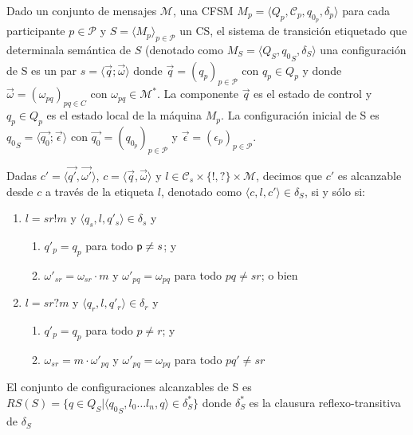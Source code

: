 \begin{definition}
\label{def:estadosyconf} Dado un conjunto de mensajes $\mathcal{M}$, una CFSM $\textit{M}_p = \langle Q_p, \mathcal{C}_p, q_{0_p}, \delta_p \rangle$ para cada participante $p \in \mathcal{P}$ y $S=\langle M_p \rangle_{p \in \mathcal{P}}$ un CS, el sistema de transición etiquetado que determinala semántica de $S$ (denotado como $M_S = \langle Q_S, 
{q_0}_S, \delta_S \rangle$ una configuración de S es un par $s = \langle \overrightarrow{q} ; \overrightarrow{\omega} \rangle$ donde $\overrightarrow{q} = (q_p)_{p \in \mathcal{P}}$ con $q_p \in Q_p$ y donde $\overrightarrow{\omega} = (\omega_{pq})_{pq \in C}$ con $\omega_{pq} \in \mathcal{M}^*$. La componente $\overrightarrow{q}$ es el estado de control y $q_p \in Q_p$ es el estado local de la máquina $ M_p$. La configuración inicial de S es ${q_0}_S = \langle \overrightarrow{q_0} ; \overrightarrow{\epsilon} \rangle$ con $\overrightarrow{q_0} = (q_{0_p})_{p \in \mathcal{P}}$ y $\overrightarrow{\epsilon} = (\epsilon_p)_{p \in \mathcal{P}}$.

Dadas $c' = \langle \overrightarrow{q'},\overrightarrow{\omega'} \rangle$, $c = \langle \overrightarrow{q},\overrightarrow{\omega} \rangle$ y $l \in \mathcal{C}_s \times \{!,?\} \times \mathcal{M}$, decimos que $c'$ es alcanzable desde $c$ a través de la etiqueta $l$, denotado como $\langle c, l, c' \rangle \in \delta_S$, si y sólo si:
    \begin{enumerate}
		\item $l=sr!m$ y $\langle q_s,l,q'_s\rangle \in \delta_s$ y 
			\begin{enumerate}
				\item $q'_p = q_p$ para todo $\mathsf{p} \neq s$; y
				\item $\omega'_{sr} = \omega_{sr} \cdot m$ y  $\omega'_{pq} = \omega_{pq}$ para todo $pq \neq sr$; o bien
			\end{enumerate}
		\item $l=sr?m$ y $\langle q_r,l,q'_r\rangle \in \delta_r$ y 
			\begin{enumerate}
			\item $q'_{p} = q_{p}$ para todo $p \neq r$; y
				\item $\omega_{sr} = m \cdot \omega'_{pq}$ y $\omega'_{pq} = \omega_{pq}$ para todo $pq' \neq sr$
			\end{enumerate}
	\end{enumerate}
El conjunto de configuraciones alcanzables de S es $RS(S) = \{q \in Q_S | \langle {q_0}_S,l_0 \ldots l_n,q \rangle \in \delta_S^* \}$ donde $\delta_S^*$ es la clausura reflexo-transitiva de $\delta_S$
\end{definition}


